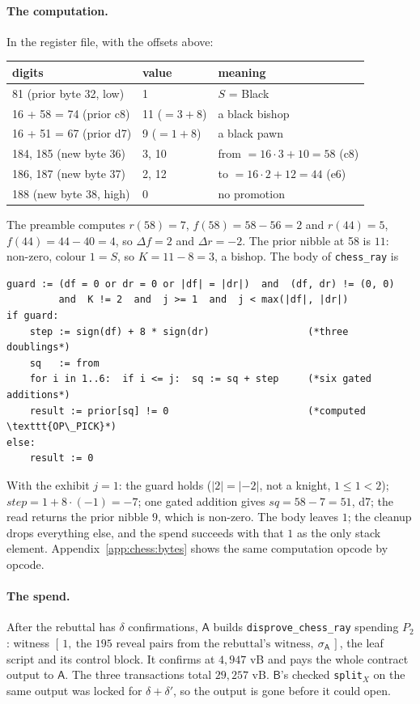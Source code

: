 \documentclass[11pt]{article}
\newcommand{\Pa}{\mathsf{A}}
\newcommand{\Pb}{\mathsf{B}}
\newcommand{\dl}{\delta}
\newcommand{\dlp}{\delta'}
\begin{document}
\paragraph{The computation.} In the register file, with the offsets
above:
\begin{center}
\begin{tabular}{@{}lll@{}}
\toprule
digits & value & meaning \\
\midrule
81 (prior byte 32, low) & 1 & $S$ = Black \\
16 + 58 = 74 (prior c8) & 11 ($= 3 + 8$) & a black bishop \\
16 + 51 = 67 (prior d7) & 9 ($= 1 + 8$) & a black pawn \\
184, 185 (new byte 36) & 3, 10 & from $= 16 \cdot 3 + 10 = 58$ (c8) \\
186, 187 (new byte 37) & 2, 12 & to $= 16 \cdot 2 + 12 = 44$ (e6) \\
188 (new byte 38, high) & 0 & no promotion \\
\bottomrule
\end{tabular}
\end{center}
The preamble computes $r(58) = 7$, $f(58) = 58 - 56 = 2$ and $r(44) =
5$, $f(44) = 44 - 40 = 4$, so $\Delta f = 2$ and $\Delta r = -2$. The
prior nibble at 58 is $11$: non-zero, colour $1 = S$, so $K = 11 - 8 =
3$, a bishop. The body of \texttt{chess\_ray} is
\begin{lstlisting}[style=script]
guard := (df = 0 or dr = 0 or |df| = |dr|)  and  (df, dr) != (0, 0)
         and  K != 2  and  j >= 1  and  j < max(|df|, |dr|)
if guard:
    step := sign(df) + 8 * sign(dr)                 (*three doublings*)
    sq   := from
    for i in 1..6:  if i <= j:  sq := sq + step     (*six gated additions*)
    result := prior[sq] != 0                        (*computed \texttt{OP\_PICK}*)
else:
    result := 0
\end{lstlisting}
With the exhibit $j = 1$: the guard holds ($|2| = |-2|$, not a
knight, $1 \le 1 < 2$); $\mathit{step} = 1 + 8 \cdot (-1) = -7$; one
gated addition gives $\mathit{sq} = 58 - 7 = 51$, d7; the read returns
the prior nibble $9$, which is non-zero. The body leaves $1$; the
cleanup drops everything else, and the spend succeeds with that $1$ as
the only stack element. Appendix~\ref{app:chess:bytes} shows the same
computation opcode by opcode.

\paragraph{The spend.} After the rebuttal has $\dl$ confirmations,
$\Pa$ builds \texttt{disprove\_chess\_ray} spending $P_2$: witness
$[\,1,\ \text{the }195\text{ reveal pairs from the rebuttal's
witness},\ \sigma_{\Pa}\,]$, the leaf script and its control block. It
confirms at $4{,}947$ vB and pays the whole contract output to $\Pa$.
The three transactions total $29{,}257$ vB. $\Pb$'s checked
\texttt{split}$_X$ on the same output was locked for $\dl + \dlp$, so
the output is gone before it could open.
\end{document}
